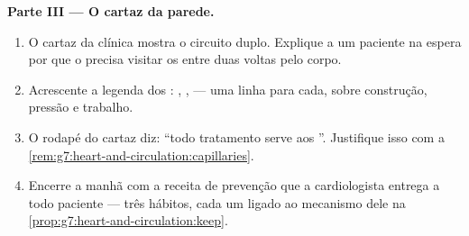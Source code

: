 \begin{problem}
\medskip\noindent\textbf{Parte III --- O cartaz da parede.}
\begin{enumerate}[resume]
  \item O cartaz da clínica mostra o circuito duplo. Explique a um
        paciente na espera por que o  precisa visitar os 
        entre duas voltas pelo corpo.
  \item Acrescente a legenda dos : , ,  --- uma
        linha para cada, sobre construção, pressão e trabalho.
  \item O rodapé do cartaz diz: ``todo tratamento serve aos
        ''. Justifique isso com a
        \cref{rem:g7:heart-and-circulation:capillaries}.
  \item Encerre a manhã com a receita de prevenção que a
        cardiologista entrega a todo paciente --- três hábitos, cada
        um ligado ao mecanismo dele na
        \cref{prop:g7:heart-and-circulation:keep}.
\end{enumerate}
\end{problem}
